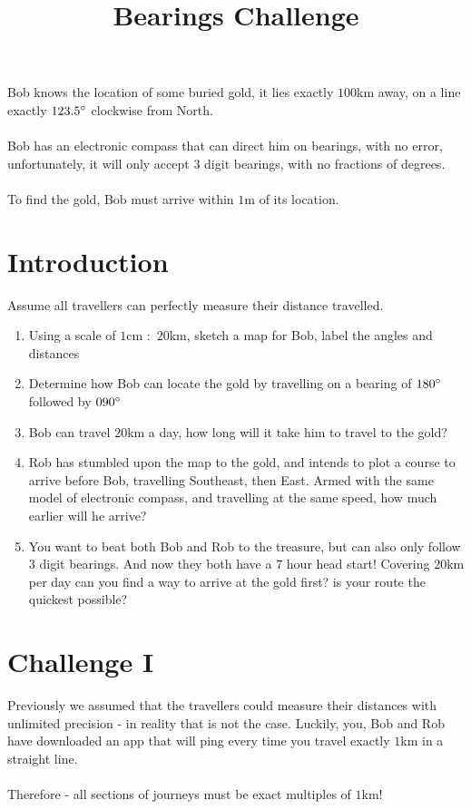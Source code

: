 \documentclass{article}
\title{Bearings Challenge}
\date{}
\begin{document}
\maketitle


Bob knows the location of some buried gold, it lies exactly $100$km away, on a line exactly $123.5 \degree$ clockwise from North.
\\ \\
Bob has an electronic compass that can direct him on bearings, with no error, unfortunately, it will only accept 3 digit bearings, with no fractions of degrees.
\\ \\
To find the gold, Bob must arrive within $1$m of its location.

\section{Introduction}

Assume all travellers can perfectly measure their distance travelled.

\begin{enumerate}
    \item Using a scale of $1$cm $:$ $20$km, sketch a map for Bob, label the angles and distances
    \item Determine how Bob can locate the gold by travelling on a bearing of $180\degree$ followed by $090\degree$
    \item Bob can travel $20$km a day, how long will it take him to travel to the gold?
    \item Rob has stumbled upon the map to the gold, and intends to plot a course to arrive before Bob, travelling Southeast, then East. Armed with the same model of electronic compass, and travelling at the same speed, how much earlier will he arrive?
    \item You want to beat both Bob and Rob to the treasure, but can also only follow $3$ digit bearings. And now they both have a $7$ hour head start! Covering $20$km per day can you find a way to arrive at the gold first? is your route the quickest possible?
\end{enumerate}

\newpage

\section{Challenge I}

Previously we assumed that the travellers could measure their distances with unlimited precision - in reality that is not the case. Luckily, you, Bob and Rob have downloaded an app that will ping every time you travel exactly $1$km in a straight line.
\\ \\ 
Therefore - all sections of journeys must be exact multiples of $1$km!
\end{document}
